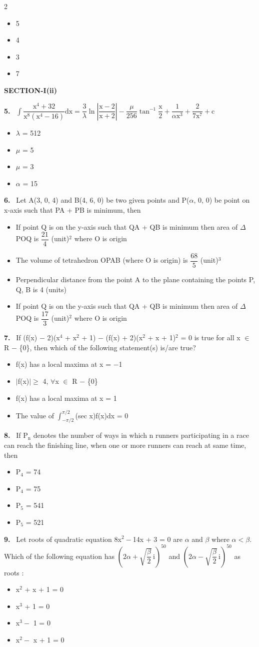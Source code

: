 \documentclass[10pt]{extarticle}
\newcommand{\sect}[1]{\par\smallskip\noindent\textbf{#1}\par}
\newcommand{\qn}[1]{\par\smallskip\noindent\textbf{#1.}~}
\newenvironment{qoptions}{\begin{itemize}[leftmargin=1.8em,itemsep=1pt,topsep=2pt,label={}]}{\end{itemize}}
\newcommand{\opt}[2]{\item[(#1)] #2}
\begin{document}
\begin{multicols}{2}
\begin{qoptions}
\opt{A}{5}
\opt{B}{4}
\opt{C}{3}
\opt{D}{7}
\end{qoptions}
\sect{SECTION-I(ii)}
\qn{5} $\displaystyle\int\dfrac{\mathrm x^4+32}{\mathrm x^8(\mathrm x^4-16)}\mathrm{dx}=\dfrac3\lambda\ln\left|\dfrac{\mathrm x-2}{\mathrm x+2}\right|-\dfrac\mu{256}\tan^{-1}\dfrac{\mathrm x}2+\dfrac1{\alpha\mathrm x^3}+\dfrac2{7\mathrm x^7}+\mathrm c$
\begin{qoptions}
\opt{A}{$\lambda$ = 512}
\opt{B}{$\mu$ = 5}
\opt{C}{$\mu$ = 3}
\opt{D}{$\alpha$ = 15}
\end{qoptions}
\qn{6} Let A(3, 0, 4) and B(4, 6, 0) be two given points and P($\alpha$, 0, 0) be point on x-axis such that PA + PB is minimum, then
\begin{qoptions}
\opt{A}{If point Q is on the y-axis such that QA + QB is minimum then area of $\Delta$POQ is $\dfrac{21}4$ (unit)$^2$ where O is origin}
\opt{B}{The volume of tetrahedron OPAB (where O is origin) is $\dfrac{68}5$ (unit)$^3$}
\opt{C}{Perpendicular distance from the point A to the plane containing the points P, Q, B is 4 (units)}
\opt{D}{If point Q is on the y-axis such that QA + QB is minimum then area of $\Delta$POQ is $\dfrac{17}3$ (unit)$^2$ where O is origin}
\end{qoptions}
\qn{7} If (f(x) $-$ 2)(x$^4$ + x$^2$ + 1) $-$ (f(x) + 2)(x$^2$ + x + 1)$^2$ = 0 is true for all x $\in$ R $-$ \{0\}, then which of the following statement(s) is/are true?
\begin{qoptions}
\opt{A}{f(x) has a local maxima at x = $-$1}
\opt{B}{$|$f(x)$|\geqslant$ 4, $\forall$x $\in$ R $-$ \{0\}}
\opt{C}{f(x) has a local maxima at x = 1}
\opt{D}{The value of $\displaystyle\int_{-\pi/2}^{\pi/2}$(sec x)f(x)dx = 0}
\end{qoptions}
\qn{8} If P$_\mathrm n$ denotes the number of ways in which n runners participating in a race can reach the finishing line, when one or more runners can reach at same time, then
\begin{qoptions}
\opt{A}{P$_4$ = 74}
\opt{B}{P$_4$ = 75}
\opt{C}{P$_5$ = 541}
\opt{D}{P$_5$ = 521}
\end{qoptions}
\qn{9} Let roots of quadratic equation 8x$^2-$14x + 3 = 0 are $\alpha$ and $\beta$ where $\alpha<\beta$. Which of the following equation has $\left(2\alpha+\sqrt{\dfrac\beta2}\,\mathrm i\right)^{50}$ and $\left(2\alpha-\sqrt{\dfrac\beta2}\,\mathrm i\right)^{50}$ as roots :
\begin{qoptions}
\opt{A}{x$^2$ + x + 1 = 0}
\opt{B}{x$^3$ + 1 = 0}
\opt{C}{x$^3-$ 1 = 0}
\opt{D}{x$^2-$ x + 1 = 0}
\end{qoptions}

\end{multicols}
\end{document}
